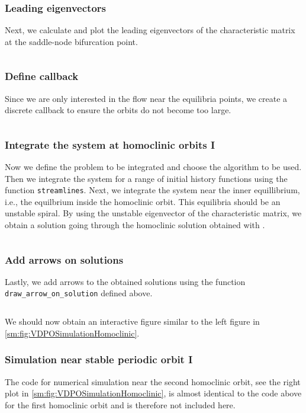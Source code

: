 \subsubsection{Leading eigenvectors}
Next, we calculate and plot the leading eigenvectors of the characteristic matrix at the saddle-node bifurcation point.
\inputminted[firstline=103, lastline=117]{julia}{\pathToJuliaFiles/vdpo_simulation_article.jl}

\subsubsection{Define callback}
Since we are only interested in the flow near the equilibria points, we create a
discrete callback to ensure the orbits do not become too large.
\inputminted[firstline=122, lastline=125]{julia}{\pathToJuliaFiles/vdpo_simulation_article.jl}

\subsubsection{Integrate the system at homoclinic orbits I}
Now we define the problem to be integrated and choose the algorithm to be used.
Then we integrate the system for a range of initial history functions using the
function \texttt{streamlines}. Next, we integrate the system near
the inner equillibrium, i.e., the equilbrium inside the homoclinic orbit. This
equilibria should be an unstable spiral. By using the unstable eigenvector of the
characteristic matrix, we obtain a solution going through the homoclinic solution
obtained with \DDEBIFTOOL.
\inputminted[firstline=127, lastline=152]{julia}{\pathToJuliaFiles/vdpo_simulation_article.jl}

\subsubsection{Add arrows on solutions}
Lastly, we add arrows to the obtained solutions using the function
\texttt{draw_arrow_on_solution} defined above.
\inputminted[firstline=154, lastline=158]{julia}{\pathToJuliaFiles/vdpo_simulation_article.jl}
We should now obtain an interactive figure similar to the left figure in \cref{sm:fig:VDPOSimulationHomoclinic}.

\subsubsection{Simulation near stable periodic orbit I}
The code for numerical simulation near the second homoclinic orbit, see the
right plot in \cref{sm:fig:VDPOSimulationHomoclinic}, is almost identical to
the code above for the first homoclinic orbit and is therefore not included
here.

